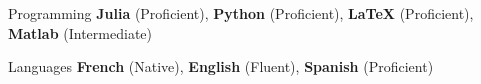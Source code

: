 

\begin{cvskills}

    \cvskill
    {Programming} %
    {\textbf{Julia} (Proficient), \textbf{Python} (Proficient), \textbf{LaTeX} (Proficient), \textbf{Matlab} (Intermediate)} %

    \cvskill
    {Languages} %
    {\textbf{French} (Native), \textbf{English} (Fluent), \textbf{Spanish} (Proficient)} %

\end{cvskills}
